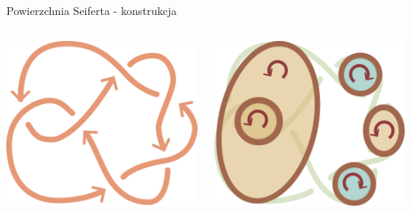\documentclass{beamer}
\begin{document}
\begin{frame}{Powierzchnia Seiferta - konstrukcja}
  \begin{columns}
    \begin{column}{0.5\textwidth}\centering
      \includegraphics[width=\textwidth]{6_1-bez-przeciec.png}
    \end{column}
    \begin{column}{0.5\textwidth}\centering
      \includegraphics[width=\textwidth]{6_1-seifert.png}
    \end{column}
  \end{columns}
\end{frame}
\end{document}
